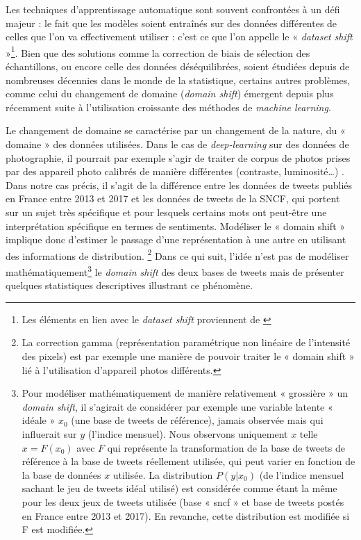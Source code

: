 \documentclass[11pt,french,french]{article}
\let\rmarkdownfootnote\footnote%
\def\footnote{\protect\rmarkdownfootnote}
\begin{document}
Les techniques d'apprentissage automatique sont souvent confrontées à un
défi majeur : le fait que les modèles soient entraînés sur des données
différentes de celles que l'on va effectivement utiliser : c'est ce que
l'on appelle le « \emph{dataset shift} »\footnote{Les éléments en lien
  avec le \emph{dataset shift} proviennent de \cite{Candela}}. Bien que
des solutions comme la correction de biais de sélection des
échantillons, ou encore celle des données déséquilibrées, soient
étudiées depuis de nombreuses décennies dans le monde de la statistique,
certains autres problèmes, comme celui du changement de domaine
(\emph{domain shift}) émergent depuis plus récemment suite à
l'utilisation croissante des méthodes de \emph{machine learning}.

Le changement de domaine se caractérise par un changement de la nature,
du « domaine » des données utilisées. Dans le cas de
\emph{deep-learning} sur des données de photographie, il pourrait par
exemple s'agir de traiter de corpus de photos prises par des appareil
photo calibrés de manière différentes (contraste, luminosité\ldots{}) .
Dans notre cas précis, il s'agit de la différence entre les données de
tweets publiés en France entre 2013 et 2017 et les données de tweets de
la SNCF, qui portent sur un sujet très spécifique et pour lesquels
certains mots ont peut-être une interprétation spécifique en termes de
sentiments. Modéliser le « domain shift » implique donc d'estimer le
passage d'une représentation à une autre en utilisant des informations
de distribution. \footnote{La correction gamma (représentation
  paramétrique non linéaire de l'intensité des pixels) est par exemple
  une manière de pouvoir traiter le « domain shift » lié à l'utilisation
  d'appareil photos différents.} Dans ce qui suit, l'idée n'est pas de
modéliser mathématiquement\footnote{Pour modéliser mathématiquement de
  manière relativement « grossière » un \emph{domain shift}, il
  s'agirait de considérer par exemple une variable latente « idéale »
  \(x_0\) (une base de tweets de référence), jamais observée mais qui
  influerait sur \(y\) (l'indice mensuel). Nous observons uniquement
  \(x\) telle \(x=F(x_0)\) avec \(F\) qui représente la transformation
  de la base de tweets de référence à la base de tweets réellement
  utilisée, qui peut varier en fonction de la base de données \(x\)
  utilisée. La distribution \(P(y|x_0)\) (de l'indice mensuel sachant le
  jeu de tweets idéal utilisé) est considérée comme étant la même pour
  les deux jeux de tweets utilisée (base « sncf » et base de tweets
  postés en France entre 2013 et 2017). En revanche, cette distribution
  est modifiée si F est modifiée.} le \emph{domain shift} des deux bases
de tweets mais de présenter quelques statistiques descriptives
illustrant ce phénomène.
\end{document}
